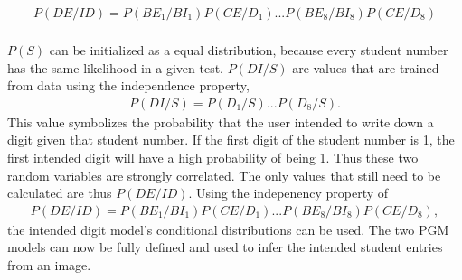 \begin{align}
P(DE/ID) = P(BE_1/BI_1)P(CE/D_1)...P(BE_8/BI_8)P(CE/D_8)\\
\label{eqn:stdEqn4}
\end{align}

$P(S)$ can be initialized as a equal distribution, because every student number has the same likelihood in a given test. $P(DI/S)$ are values that are trained from data using the independence property, 
\begin{align}
P(DI/S) = P(D_1/S)...P(D_8/S).
\label{eqn:stdEqn4}
\end{align}
This value symbolizes the probability that the user intended to write down a digit given that student number. If the first digit of the student number is 1, the first intended digit will have a high probability of being 1. Thus these two random variables are strongly correlated. The only values that still need to be calculated are thus $P(DE/ID)$. Using the indepenency property of \begin{align}
P(DE/ID) = P(BE_1/BI_1)P(CE/D_1)...P(BE_8/BI_8)P(CE/D_8),
\label{eqn:stdEqn4}
\end{align}
the intended digit model's conditional distributions can be used. The two PGM models can now be fully defined and used to infer the intended student entries from an image.